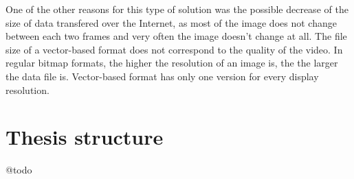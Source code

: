 One of the other reasons for this type of solution was the possible decrease of the size of data transfered over the Internet, as most of the image does not change between each two frames and very often the image doesn't change at all. The file size of a vector-based format does not correspond to the quality of the video. In regular bitmap formats, the higher the resolution of an image is, the the larger the data file is. Vector-based format has only one version for every display resolution.

\section*{Thesis structure}
@todo